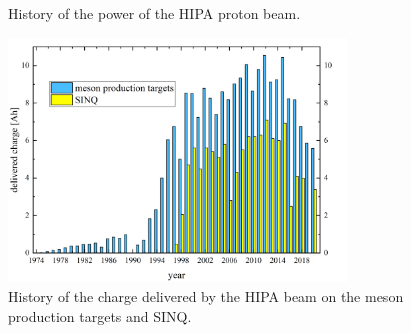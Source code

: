 \begin{refsection}
\begin{figure}
            \caption[HIPA: power history]{History of the power of the HIPA proton beam.}
            \label{fig:PSI:HIPA:power}
        \end{figure}
        \begin{figure}
            \centering
            \includegraphics[width = 0.8\textwidth]{Figures/Introduction/PSI_HIPA_charge.png}
            \caption[HIPA: charge history]{History of the charge delivered by the HIPA beam on the meson production targets and SINQ.}
            \label{fig:PSI:HIPA:charge}
        \end{figure}
   

\end{refsection}
